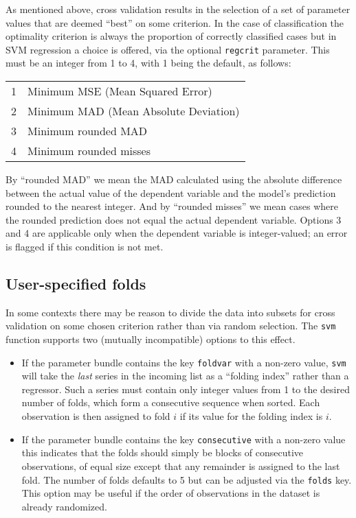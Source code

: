\documentclass{article}
\begin{document}
As mentioned above, cross validation results in the selection of a set
of parameter values that are deemed ``best'' on some criterion. In the
case of classification the optimality criterion is always the
proportion of correctly classified cases but in SVM regression a
choice is offered, via the optional \texttt{regcrit} parameter. This
must be an integer from 1 to 4, with 1 being the default, as follows:
%
\begin{center}
  \begin{tabular}{ll}
    1 & Minimum MSE (Mean Squared Error) \\
    2 & Minimum MAD (Mean Absolute Deviation) \\
    3 & Minimum rounded MAD \\
    4 & Minimum rounded misses\\
  \end{tabular}
\end{center}
%
By ``rounded MAD'' we mean the MAD calculated using the absolute
difference between the actual value of the dependent variable and the
model's prediction rounded to the nearest integer. And by ``rounded
misses'' we mean cases where the rounded prediction does not equal the
actual dependent variable. Options 3 and 4 are applicable only when
the dependent variable is integer-valued; an error is flagged if this
condition is not met.

\subsection{User-specified folds}
\label{sec:user-folds}

In some contexts there may be reason to divide the data into subsets
for cross validation on some chosen criterion rather than via random
selection. The \texttt{svm} function supports two (mutually
incompatible) options to this effect.
\begin{itemize}
\item If the parameter bundle contains the key \texttt{foldvar} with a
  non-zero value, \texttt{svm} will take the \textit{last} series in
  the incoming list as a ``folding index'' rather than a
  regressor. Such a series must contain only integer values from 1 to
  the desired number of folds, which form a consecutive sequence when
  sorted. Each observation is then assigned to fold $i$ if its value
  for the folding index is $i$.
\item If the parameter bundle contains the key \texttt{consecutive}
  with a non-zero value this indicates that the folds should simply be
  blocks of consecutive observations, of equal size except that any
  remainder is assigned to the last fold. The number of folds defaults
  to 5 but can be adjusted via the \texttt{folds} key. This option may
  be useful if the order of observations in the dataset is already
  randomized.
\end{itemize}
\end{document}
